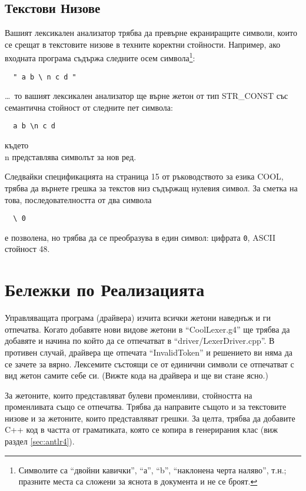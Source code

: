 \documentclass[11pt]{article}
\begin{document}
\subsection{Текстови Низове}

Вашият лексикален анализатор трябва да превърне екраниращите символи, които се срещат в текстовите низове в техните коректни стойности.
Например, ако входната програма съдържа следните осем символа\footnote{Символите са ``двойни кавички'', ``а'', ``b'', ``наклонена черта наляво'', т.н.; празните места са сложени за яснота в документа и не се броят.}:

\begin{verbatim}
  " a b \ n c d "
\end{verbatim}

\noindent \ldots\ то вашият лексикален анализатор ще върне жетон от тип STR\_CONST със семантична стойност от следните пет символа:

\begin{verbatim}
  a b \n c d
\end{verbatim}

\noindent където \\n представлява символът за нов ред.

Следвайки спецификацията на страница 15 от ръководството за езика COOL, трябва да върнете грешка за текстов низ съдържащ нулевия символ.
За сметка на това, последователността от два символа

\begin{verbatim}
  \ 0
\end{verbatim}

\noindent е позволена, но трябва да се преобразува в един символ: цифрата \texttt{0}, ASCII стойност 48.

\section{Бележки по Реализацията}

Управляващата програма (драйвера) изчита всички жетони наведнъж и ги отпечатва.
Когато добавяте нови видове жетони в ``CoolLexer.g4'' ще трябва да добавяте и начина по който да се отпечатват в ``driver/LexerDriver.cpp''.
В противен случай, драйвера ще отпечата ``InvalidToken'' и решението ви няма да се зачете за вярно.
Лексемите състоящи се от единични символи се отпечатват с вид жетон самите себе си.
(Вижте кода на драйвера и ще ви стане ясно.)

За жетоните, които представляват булеви променливи, стойността на променливата също се отпечатва.
Трябва да направите същото и за текстовите низове и за жетоните, които представляват грешки.
За целта, трябва да добавите C++ код в частта от граматиката, която се копира в генерирания клас (виж раздел \ref{sec:antlr4}).
\end{document}
